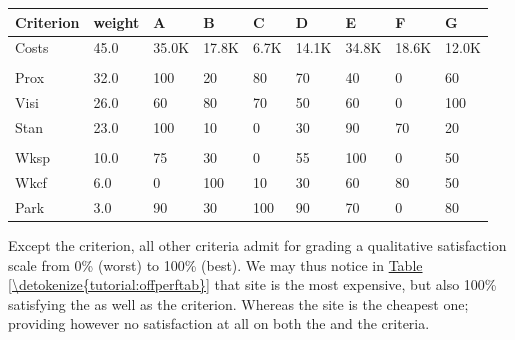 \documentclass[a4paper,12pt,english]{sphinxhowto}
\begin{document}
\begin{savenotes}\sphinxattablestart
\centering
{}
\sphinxthecaptionisattop
{}\label{\detokenize{tutorial:offperftab}}
\sphinxaftertopcaption
\begin{tabulary}{\linewidth}[t]{|T|T|T|T|T|T|T|T|T|}
\hline
\sphinxstyletheadfamily 
Criterion
&\sphinxstyletheadfamily 
weight
&\sphinxstyletheadfamily 
A
&\sphinxstyletheadfamily 
B
&\sphinxstyletheadfamily 
C
&\sphinxstyletheadfamily 
D
&\sphinxstyletheadfamily 
E
&\sphinxstyletheadfamily 
F
&\sphinxstyletheadfamily 
G
\\
\hline
Costs
&
45.0
&
35.0K\texteuro{}
&
17.8K\texteuro{}
&
6.7K\texteuro{}
&
14.1K\texteuro{}
&
34.8K\texteuro{}
&
18.6K\texteuro{}
&
12.0K\texteuro{}
\\
\hline

&

&

&

&

&

&

&

&

\\
\hline
Prox
&
32.0
&
100
&
20
&
80
&
70
&
40
&
0
&
60
\\
\hline
Visi
&
26.0
&
60
&
80
&
70
&
50
&
60
&
0
&
100
\\
\hline
Stan
&
23.0
&
100
&
10
&
0
&
30
&
90
&
70
&
20
\\
\hline

&

&

&

&

&

&

&

&

\\
\hline
Wksp
&
10.0
&
75
&
30
&
0
&
55
&
100
&
0
&
50
\\
\hline
Wkcf
&
6.0
&
0
&
100
&
10
&
30
&
60
&
80
&
50
\\
\hline
Park
&
3.0
&
90
&
30
&
100
&
90
&
70
&
0
&
80
\\
\hline
\end{tabulary}
\par
\sphinxattableend\end{savenotes}

Except the  criterion, all other criteria admit for grading a qualitative satisfaction scale from 0\% (worst) to 100\% (best). We may thus notice in \hyperref[\detokenize{tutorial:offperftab}]{Table \ref{\detokenize{tutorial:offperftab}}} that site  is the most expensive, but also 100\% satisfying the  as well as the   criterion. Whereas the site  is the cheapest one; providing however no satisfaction at all on both the  and the  criteria.
\end{document}

